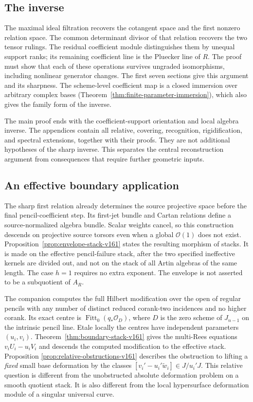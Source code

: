 \documentclass[11pt,reqno]{amsart}
\numberwithin{equation}{section}
\theoremstyle{definition}\newtheorem{definition}[theorem]{Definition}
\theoremstyle{remark}\newtheorem{remark}[theorem]{Remark}
\newcommand{\OO}{\mathcal O}\newcommand{\II}{\mathcal I}
\DeclareMathOperator{\Fitt}{Fitt}\DeclareMathOperator{\Ann}{Ann}
\begin{document}
\subsection{The inverse}
The maximal ideal filtration recovers the cotangent space and the
first nonzero relation space. The common determinant divisor of
that relation recovers the two tensor rulings. The residual
coefficient module distinguishes them by unequal support ranks;
its remaining coefficient line is the Pluecker line of $R$.
The proof must show that each of these operations survives ungraded
isomorphisms, including nonlinear generator changes. The first seven
sections give this argument and its sharpness. The scheme-level
coefficient map is a closed immersion over arbitrary complex bases
(Theorem~\ref{thm:finite-parameter-immersion}), which also gives the
family form of the inverse.

The main proof ends with the coefficient-support orientation and
local algebra inverse. The appendices contain all relative,
covering, recognition, rigidification, and spectral extensions,
together with their proofs. They are not additional hypotheses of
the sharp inverse. This separates the central reconstruction
argument from consequences that require further geometric inputs.

\subsection{An effective boundary application}
The sharp first relation already determines the source projective
space before the final pencil-coefficient step. Its first-jet
bundle and Cartan relations define a source-normalized algebra
bundle. Scalar weights cancel, so this construction descends on
projective source torsors even when a global $\OO(1)$ does not exist.
Proposition~\ref{prop:envelope-stack-v161} states the resulting
morphism of stacks. It is made on the effective pencil-failure
stack, after the two specified ineffective kernels are divided out,
and not on the stack of all Artin algebras of the same length.
The case $h=1$ requires no extra exponent. The envelope is not
asserted to be a subquotient of $A_R$.

The companion computes the full Hilbert modification over the open
of regular pencils with any number of distinct reduced corank-two
incidences and no higher corank. Its exact centre is
$\Fitt_0(q_*\OO_D)$, where $D$ is the zero scheme of $J_{n-1}$ on
the intrinsic pencil line. Etale locally the centres have independent
parameters $(u_i,v_i)$. Theorem~\ref{thm:boundary-stack-v161} gives
the multi-Rees equations $v_iU_i-u_iV_i$ and descends the computed
modification to the effective stack. Proposition
\ref{prop:relative-obstructions-v161} describes the obstruction to
lifting a \emph{fixed} small base deformation by the classes
$[v_i'-u_i'\widetilde w_i]\in J/u_i'J$. This relative question is
different from the unobstructed absolute deformation problem on a
smooth quotient stack. It is also different from the local
hypersurface deformation module of a singular universal curve.
\end{document}
